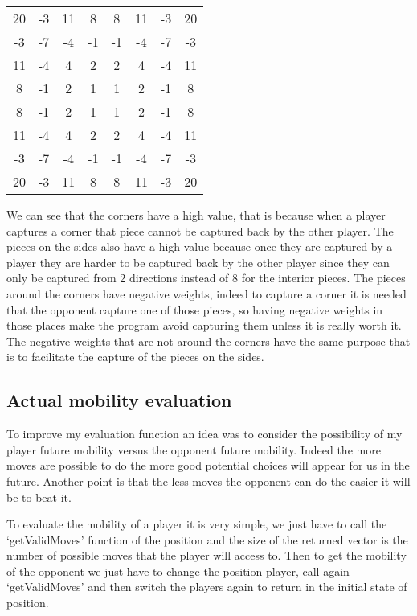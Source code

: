 \begin{center}
    \begin{tabular}{ c c c c c c c c } 
        20 & -3 & 11 & 8 & 8 & 11 & -3 & 20\\ 
        -3 & -7 & -4 & -1 & -1 & -4 & -7 & -3\\ 
        11 & -4 & 4 & 2 & 2 & 4 & -4 & 11\\ 
        8 & -1 & 2 & 1 & 1 & 2 & -1 & 8\\ 
        8 & -1 & 2 & 1 & 1 & 2 & -1 & 8\\ 
        11 & -4 & 4 & 2 & 2 & 4 & -4 & 11\\ 
        -3 & -7 & -4 & -1 & -1 & -4 & -7 & -3\\ 
        20 & -3 & 11 & 8 & 8 & 11 & -3 & 20\\ 
    \end{tabular}
\end{center}

We can see that the corners have a high value, that is because when a player captures a corner that piece cannot be captured back by the other player.
The pieces on the sides also have a high value because once they are captured by a player they are harder to be captured back by the other player since they can only be captured from 2 directions instead of 8 for the interior pieces.
The pieces around the corners have negative weights, indeed to capture a corner it is needed that the opponent capture one of those pieces, so having negative weights in those places make the program avoid capturing them unless it is really worth it.
The negative weights that are not around the corners have the same purpose that is to facilitate the capture of the pieces on the sides.

\subsection{Actual mobility evaluation}

To improve my evaluation function an idea was to consider the possibility of my player future mobility versus the opponent future mobility.
Indeed the more moves are possible to do the more good potential choices will appear for us in the future.
Another point is that the less moves the opponent can do the easier it will be to beat it.

To evaluate the mobility of a player it is very simple, we just have to call the `getValidMoves' function of the position and the size of the returned vector is the number of possible moves that the player will access to.
Then to get the mobility of the opponent we just have to change the position player, call again `getValidMoves' and then switch the players again to return in the initial state of position.

